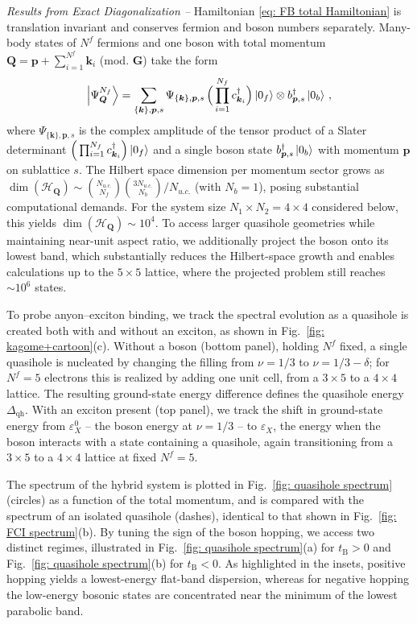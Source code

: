 \documentclass[aps,prl,twocolumn,amsmath,amssymb,nofootinbib,superscriptaddress,floatfix]{revtex4-1}
\newcommand{\bs}[1]{{\boldsymbol{#1}}}
\begin{document}
\noindent
\textit{Results from Exact Diagonalization --}
{Hamiltonian \eqref{eq: FB total Hamiltonian} is translation invariant and conserves fermion and boson numbers separately. Many-body states of $N^{f}$ fermions and one boson with total momentum $\bs{Q} = \bs{p} +\sum^{N^{f}}_{i = 1}\bs{k}_i$ (mod. $\bs{G}$) take the form}
\begin{equation}
\label{eq: Q state}
\ket{\Psi^{N_f}_{\bs Q}}
=
\sum_{\{\bs k\},\bs p,s}
\Psi_{\{\bs k\},\bs p,s}\,
\Big(\prod_{i=1}^{N_f}
c^\dagger_{\bs k_i}\Big)\ket{0_f}
\otimes
b^\dagger_{\bs p, s}\ket{0_b}\, ,
\end{equation}
{where $\Psi_{\{\bs k\},\bs p,s}$ is the complex amplitude of the tensor product of a Slater determinant $\Big(\prod_{i=1}^{N_f} c^\dagger_{\bs k_i}\Big)\ket{0_f}$ and a single boson state $b^{\dagger}_{\bs{p},s}\ket{0_{b}}$ with momentum $\bs{p}$ on sublattice $s$. The Hilbert space dimension per momentum sector grows as $\dim(\mathcal{H}_{\bs{Q}})\sim \binom{N_{u.c.}}{N_f}\binom{3N_{u.c.}}{N_b}/N_{u.c.}$ (with $N_b=1$), posing substantial computational demands.}
{For the system size $N_1\times N_2=4\times4$ considered below, this yields $\dim(\mathcal H_{\mathbf Q})\sim 10^4$. To access larger quasihole geometries while maintaining near-unit aspect ratio, we additionally project the boson onto its lowest band, which substantially reduces the Hilbert-space growth and enables calculations up to the $5\times5$ lattice, where the projected problem still reaches $\sim 10^6$ states.}

{To probe anyon--exciton binding, we track the spectral evolution as a quasihole is created both with and without an exciton, as shown in Fig.~\ref{fig: kagome+cartoon}(c). Without a boson (bottom panel), holding $N^{f}$ fixed, a single quasihole is nucleated by changing the filling from $\nu = 1/3$ to $\nu = 1/3 - \delta$; for $N^{f}=5$ electrons this is realized by adding one unit cell, from a $3 \times 5$ to a $4 \times 4$ lattice. The resulting ground-state energy difference defines the quasihole energy $\Delta_{\textrm{qh}}$. With an exciton present (top panel), we track the shift in ground-state energy from $\varepsilon_X^{0}$ -- the boson energy at $\nu=1/3$ -- to $\varepsilon_X$, the energy when the boson interacts with a state containing a quasihole, again transitioning from a $3\times5$ to a $4\times4$ lattice at fixed $N^{f}=5$.
}


The spectrum of the
hybrid system is plotted
in Fig.~\ref{fig: quasihole spectrum}  (circles) as a function of the total momentum, and is compared with the spectrum of an isolated quasihole (dashes), identical to that shown in Fig.~\ref{fig: FCI spectrum}(b). By tuning the sign of the boson hopping, we access two distinct regimes, illustrated in Fig.~\ref{fig: quasihole spectrum}(a) for $t_\text{B}>0$ and Fig.~\ref{fig: quasihole spectrum}(b) for $t_\text{B}<0$. As highlighted in the insets, positive
hopping yields a lowest-energy flat-band dispersion, whereas for negative hopping the low-energy bosonic states are concentrated near the minimum of the lowest parabolic band.
\end{document}
